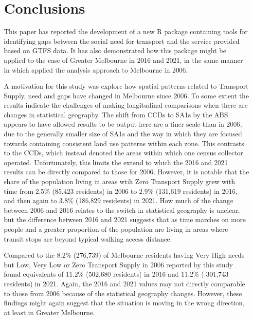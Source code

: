 \documentclass[preprint, 3p,
authoryear]{elsarticle} %
\begin{document}
\section{Conclusions}\label{conclusions}

This paper has reported the development of a new R package containing
tools for identifying gaps between the social need for transport and the
service provided based on GTFS data. It has also demonstrated how this
package might be applied to the case of Greater Melbourne in 2016 and
2021, in the same manner in which \citet{currie2010identifying} applied
the analysis approach to Melbourne in 2006.

A motivation for this study was explore how spatial patterns related to
Transport Supply, need and gaps have changed in Melbourne since 2006. To
some extent the results indicate the challenges of making longitudinal
comparisons when there are changes in statistical geography. The shift
from CCDs to SA1s by the ABS appears to have allowed results to be
output here are a finer scale than in 2006, due to the generally smaller
size of SA1s and the way in which they are focused towards containing
consistent land use patterns within each zone. This contrasts to the
CCDs, which instead denoted the areas within which one census collector
operated. Unfortunately, this limits the extend to which the 2016 and
2021 results can be directly compared to those for 2006. However, it is
notable that the share of the population living in areas wtih Zero
Transport Supply grew with time from 2.5\% (85,423 residents) in 2006 to
2.9\% (131,619 residents) in 2016, and then again to 3.8\% (186,829
residents) in 2021. How much of the change between 2006 and 2016 relates
to the switch in statistical geography is unclear, but the difference
between 2016 and 2021 suggests that as time marches on more people and a
greater proportion of the population are living in areas where transit
stops are beyond typical walking access distance.

Compared to the 8.2\% (276,739) of Melbourne residents having Very High
needs but Low, Very Low or Zero Transport Supply in 2006 reported by
\citet{currie2010identifying} this study found equivalents of 11.2\%
(502,680 residents) in 2016 and 11.2\% ( 301,743 residents) in 2021.
Again, the 2016 and 2021 values may not directly comparable to those
from 2006 because of the statistical geography changes. However, these
findings might again suggest that the situation is moving in the wrong
direction, at least in Greater Melbourne.
\end{document}
